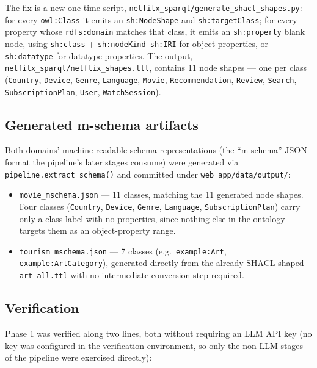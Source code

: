 \documentclass[11pt,a4paper]{article}
\newcommand{\code}[1]{\texttt{#1}}
\begin{document}
The fix is a new one-time script, \code{netfilx\_sparql\slash{}generate\_shacl\_shapes.py}: for every
\code{owl:Class} it emits an \code{sh:NodeShape} and \code{sh:targetClass}; for every property
whose \code{rdfs:domain} matches that class, it emits an \code{sh:property} blank node, using
\code{sh:class} + \code{sh:nodeKind sh:IRI} for object properties, or \code{sh:datatype} for
datatype properties. The output, \code{netfilx\_sparql\slash{}netflix\_shapes.ttl}, contains 11 node
shapes --- one per class (\code{Country}, \code{Device}, \code{Genre}, \code{Language},
\code{Movie}, \code{Recommendation}, \code{Review}, \code{Search}, \code{SubscriptionPlan},
\code{User}, \code{WatchSession}).

\subsection{Generated m-schema artifacts}

Both domains' machine-readable schema representations (the ``m-schema'' JSON format the
pipeline's later stages consume) were generated via \code{pipeline.extract\_schema()} and
committed under \code{web\_app/data/output/}:

\begin{itemize}
    \item \code{movie\_mschema.json} --- 11 classes, matching the 11 generated node shapes. Four
        classes (\code{Country}, \code{Device}, \code{Genre}, \code{Language},
        \code{SubscriptionPlan}) carry only a class label with no properties, since nothing else
        in the ontology targets them as an object-property range.
    \item \code{tourism\_mschema.json} --- 7 classes (e.g.\ \code{example:Art},
        \code{example:ArtCategory}), generated directly from the already-SHACL-shaped
        \code{art\_all.ttl} with no intermediate conversion step required.
\end{itemize}

\subsection{Verification}

Phase 1 was verified along two lines, both without requiring an LLM API key (no key was
configured in the verification environment, so only the non-LLM stages of the pipeline were
exercised directly):
\end{document}
